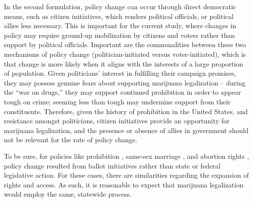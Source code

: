 In the second formulation, policy change can occur through direct democratic means, such as citizen initiatives, which renders political officials, or political allies less necessary. This is important for the current study, where changes in policy may require ground-up mobilization by citizens and voters rather than support by political officials. Important are the commonalities between these two mechanisms of policy change (politician-initiated versus voter-initiated), which is that change is more likely when it aligns with the interests of a large proportion of population. Given politicians' interest in fulfilling their campaign promises, they may possess genuine fears about supporting marijuana legalization -- during the ``war on drugs,'' they may support continued prohibition in order to appear tough on crime; seeming less than tough may undermine support from their constituents. Therefore, given the history of prohibition in the United States, and resistance amongst politicians, citizen initiatives provide an opportunity for marijuana legalization, and the presence or absence of allies in government should not be relevant for the rate of policy change. 

To be sure, for policies like prohibition \citep{andrews_and_seguin_2015,gusfield_1963}, same-sex marriage \citep{soule_2004}, and abortion rights \citep{mcveigh_and_diaz_2009}, policy change resulted from ballot initiatives rather than state or federal legislative action. For these cases, there are similarities regarding the expansion of rights and access. As such, it is reasonable to expect that marijuana legalization would employ the same, statewide process.




